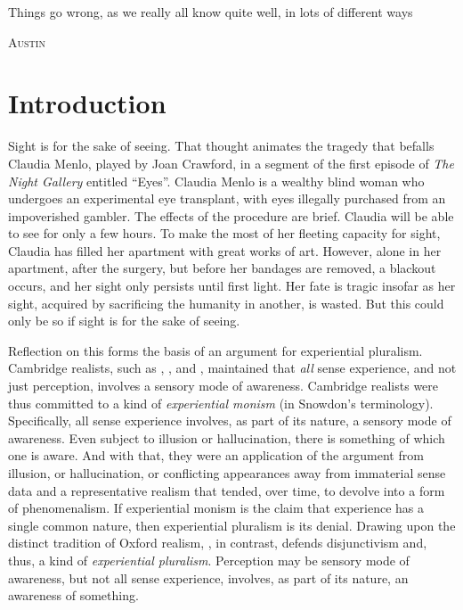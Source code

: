 \documentclass[12pt]{article}
\begin{document}
\maketitle

\epigraph{Things go wrong, as we really all know quite well, in lots of different ways}{\textsc{Austin}}

\setlength{\parindent}{1em}


\section{Introduction} %
\label{sec:introduction}

Sight is for the sake of seeing. That thought animates the tragedy that befalls Claudia Menlo, played by Joan Crawford, in a segment of the first episode of \emph{The Night Gallery} entitled ``Eyes''. Claudia Menlo is a wealthy blind woman who undergoes an experimental eye transplant, with eyes illegally purchased from an impoverished gambler. The effects of the procedure are brief. Claudia will be able to see for only a few hours. To make the most of her fleeting capacity for sight, Claudia has filled her apartment with great works of art. However, alone in her apartment, after the surgery, but before her bandages are removed, a blackout occurs, and her sight only persists until first light. Her fate is tragic insofar as her sight, acquired by sacrificing the humanity in another, is wasted. But this could only be so if sight is for the sake of seeing.

Reflection on this forms the basis of an argument for experiential pluralism. Cambridge realists, such as \citet{Moore:1953nx}, \citet{Russell:1912uq}, and \citet{Price:1932fk}, maintained that \emph{all} sense experience, and not just perception, involves a sensory mode of awareness. Cambridge realists were thus committed to a kind of \emph{experiential monism} (in Snowdon's \citeyear{Snowdon:2008oz} terminology). Specifically, all sense experience involves, as part of its nature, a sensory mode of awareness. Even subject to illusion or hallucination, there is something of which one is aware. And with that, they were an application of the argument from illusion, or hallucination, or conflicting appearances away from immaterial sense data and a representative realism that tended, over time, to devolve into a form of phenomenalism. If experiential monism is the claim that experience has a single common nature, then experiential pluralism is its denial. Drawing upon the distinct tradition of Oxford realism, \citet{Travis:2005ys}, in contrast, defends disjunctivism and, thus, a kind of \emph{experiential pluralism}. Perception may be sensory mode of awareness, but not all sense experience, involves, as part of its nature, an awareness of something. 
\end{document}
